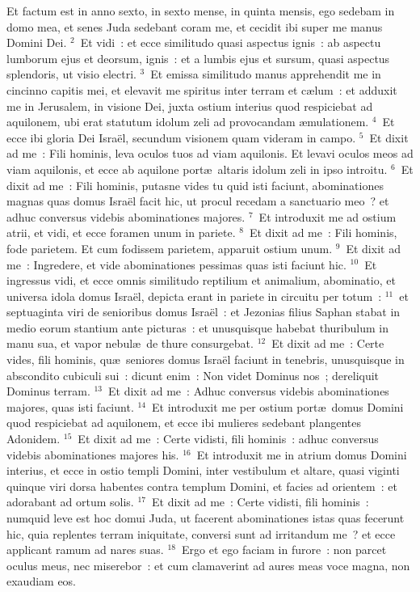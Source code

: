 \bchapter
\lettrine[lines=3,image=true,loversize=0.05,lraise=-0.03]{E}{}t factum est in anno sexto, in sexto mense, in quinta mensis, ego sedebam in domo mea, et senes Juda sedebant coram me, et cecidit ibi super me manus Domini Dei.
${}^{2}$~Et vidi~: et ecce similitudo quasi aspectus ignis~: ab aspectu lumborum ejus et deorsum, ignis~: et a lumbis ejus et sursum, quasi aspectus splendoris, ut visio electri.
${}^{3}$~Et emissa similitudo manus apprehendit me in cincinno capitis mei, et elevavit me spiritus inter terram et c\ae lum~: et adduxit me in Jerusalem, in visione Dei, juxta ostium interius quod respiciebat ad aquilonem, ubi erat statutum idolum zeli ad provocandam \ae mulationem.
${}^{4}$~Et ecce ibi gloria Dei Isra\"el, secundum visionem quam videram in campo.
${}^{5}$~Et dixit ad me~: Fili hominis, leva oculos tuos ad viam aquilonis. Et levavi oculos meos ad viam aquilonis, et ecce ab aquilone port\ae\ altaris idolum zeli in ipso introitu.
${}^{6}$~Et dixit ad me~: Fili hominis, putasne vides tu quid isti faciunt, abominationes magnas quas domus Isra\"el facit hic, ut procul recedam a sanctuario meo~? et adhuc conversus videbis abominationes majores.
${}^{7}$~Et introduxit me ad ostium atrii, et vidi, et ecce foramen unum in pariete.
${}^{8}$~Et dixit ad me~: Fili hominis, fode parietem. Et cum fodissem parietem, apparuit ostium unum.
${}^{9}$~Et dixit ad me~: Ingredere, et vide abominationes pessimas quas isti faciunt hic.
${}^{10}$~Et ingressus vidi, et ecce omnis similitudo reptilium et animalium, abominatio, et universa idola domus Isra\"el, depicta erant in pariete in circuitu per totum~:
${}^{11}$~et septuaginta viri de senioribus domus Isra\"el~: et Jezonias filius Saphan stabat in medio eorum stantium ante picturas~: et unusquisque habebat thuribulum in manu sua, et vapor nebul\ae\ de thure consurgebat.
${}^{12}$~Et dixit ad me~: Certe vides, fili hominis, qu\ae\ seniores domus Isra\"el faciunt in tenebris, unusquisque in abscondito cubiculi sui~: dicunt enim~: Non videt Dominus nos~; dereliquit Dominus terram.
${}^{13}$~Et dixit ad me~: Adhuc conversus videbis abominationes majores, quas isti faciunt.
${}^{14}$~Et introduxit me per ostium port\ae\ domus Domini quod respiciebat ad aquilonem, et ecce ibi mulieres sedebant plangentes Adonidem.
${}^{15}$~Et dixit ad me~: Certe vidisti, fili hominis~: adhuc conversus videbis abominationes majores his.
${}^{16}$~Et introduxit me in atrium domus Domini interius, et ecce in ostio templi Domini, inter vestibulum et altare, quasi viginti quinque viri dorsa habentes contra templum Domini, et facies ad orientem~: et adorabant ad ortum solis.
${}^{17}$~Et dixit ad me~: Certe vidisti, fili hominis~: numquid leve est hoc domui Juda, ut facerent abominationes istas quas fecerunt hic, quia replentes terram iniquitate, conversi sunt ad irritandum me~? et ecce applicant ramum ad nares suas.
${}^{18}$~Ergo et ego faciam in furore~: non parcet oculus meus, nec miserebor~: et cum clamaverint ad aures meas voce magna, non exaudiam eos.

